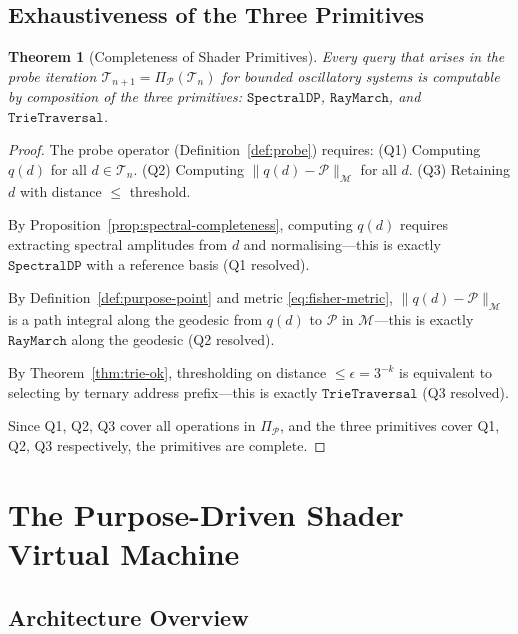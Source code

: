\documentclass[10pt,twocolumn]{article}
\newtheorem{theorem}{Theorem}[section]
\newcommand{\ProbeOp}{\Pi_\mathcal{P}}
\newcommand{\TruthCell}{\mathcal{T}}
\newcommand{\PurposePoint}{\mathcal{P}}
\newcommand{\ManifoldM}{\mathcal{M}}
\begin{document}
\subsection{Exhaustiveness of the Three Primitives}

\begin{theorem}[Completeness of Shader Primitives]
\label{thm:completeness}
Every query that arises in the probe iteration $\TruthCell_{n+1} = \ProbeOp(\TruthCell_n)$
for bounded oscillatory systems is computable by composition of
the three primitives: $\mathtt{SpectralDP}$, $\mathtt{RayMarch}$, and
$\mathtt{TrieTraversal}$.
\end{theorem}

\begin{proof}
The probe operator (Definition~\ref{def:probe}) requires:
(Q1) Computing $q(d)$ for all $d \in \TruthCell_n$.
(Q2) Computing $\|q(d) - \PurposePoint\|_\ManifoldM$ for all $d$.
(Q3) Retaining $d$ with distance $\leq$ threshold.

By Proposition~\ref{prop:spectral-completeness}, computing $q(d)$ requires
extracting spectral amplitudes from $d$ and normalising---this is exactly
$\mathtt{SpectralDP}$ with a reference basis (Q1 resolved).

By Definition~\ref{def:purpose-point} and metric \eqref{eq:fisher-metric},
$\|q(d) - \PurposePoint\|_\ManifoldM$ is a path integral along the geodesic
from $q(d)$ to $\PurposePoint$ in $\ManifoldM$---this is exactly
$\mathtt{RayMarch}$ along the geodesic (Q2 resolved).

By Theorem~\ref{thm:trie-ok}, thresholding on distance $\leq \epsilon = 3^{-k}$
is equivalent to selecting by ternary address prefix---this is exactly
$\mathtt{TrieTraversal}$ (Q3 resolved).

Since Q1, Q2, Q3 cover all operations in $\ProbeOp$, and the three
primitives cover Q1, Q2, Q3 respectively, the primitives are complete.
\end{proof}

\section{The Purpose-Driven Shader Virtual Machine}
\label{sec:pdsvm}

\subsection{Architecture Overview}
\end{document}
